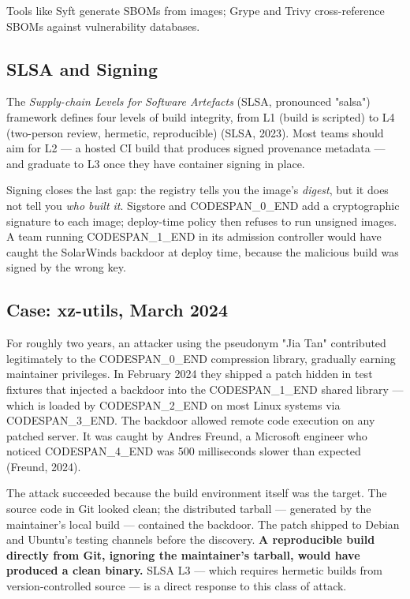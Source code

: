 \documentclass[11pt,a4paper]{book}
\begin{document}
Tools like Syft generate SBOMs from images; Grype and Trivy cross-reference SBOMs against vulnerability databases.

\subsection{SLSA and Signing}

The \textit{Supply-chain Levels for Software Artefacts} (SLSA, pronounced "salsa") framework defines four levels of build integrity, from L1 (build is scripted) to L4 (two-person review, hermetic, reproducible) (SLSA, 2023). Most teams should aim for L2 --- a hosted CI build that produces signed provenance metadata --- and graduate to L3 once they have container signing in place.

Signing closes the last gap: the registry tells you the image's \textit{digest}, but it does not tell you \textit{who built it}. Sigstore and CODESPAN\_0\_END add a cryptographic signature to each image; deploy-time policy then refuses to run unsigned images. A team running CODESPAN\_1\_END in its admission controller would have caught the SolarWinds backdoor at deploy time, because the malicious build was signed by the wrong key.

\subsection{Case: xz-utils, March 2024}

For roughly two years, an attacker using the pseudonym "Jia Tan" contributed legitimately to the CODESPAN\_0\_END compression library, gradually earning maintainer privileges. In February 2024 they shipped a patch hidden in test fixtures that injected a backdoor into the CODESPAN\_1\_END shared library --- which is loaded by CODESPAN\_2\_END on most Linux systems via CODESPAN\_3\_END. The backdoor allowed remote code execution on any patched server. It was caught by Andres Freund, a Microsoft engineer who noticed CODESPAN\_4\_END was 500 milliseconds slower than expected (Freund, 2024).

The attack succeeded because the build environment itself was the target. The source code in Git looked clean; the distributed tarball --- generated by the maintainer's local build --- contained the backdoor. The patch shipped to Debian and Ubuntu's testing channels before the discovery. \textbf{A reproducible build directly from Git, ignoring the maintainer's tarball, would have produced a clean binary.} SLSA L3 --- which requires hermetic builds from version-controlled source --- is a direct response to this class of attack.
\end{document}
